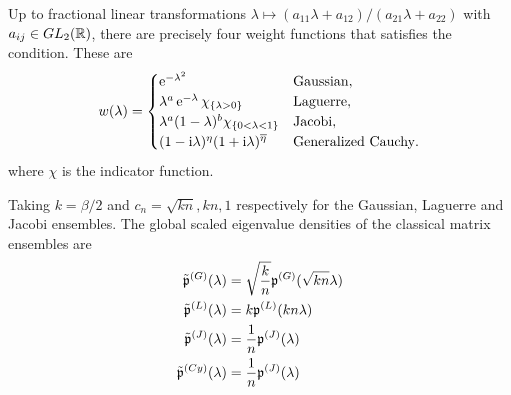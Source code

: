 Up to fractional linear transformations $\lambda \mapsto (a_{11} \lambda + a_{12})/(a_{21} \lambda + a_{22})$ with $a_{ij}\in GL_2(\mathbb{R})$, there are precisely four weight functions that satisfies the condition. These are
\begin{equation}
	w(\lambda) = \begin{cases}
		\operatorname{e}^{-\lambda^2} & \text{Gaussian}, \\
		\lambda^a \operatorname{e}^{-\lambda} \chi_{\{\lambda>0\}} & \text{Laguerre}, \\
		\lambda^a (1-\lambda)^b \chi_{\{0<\lambda<1\}} & \text{Jacobi}, \\
		(1-\mathrm{i}\lambda)^{\eta}(1+\mathrm{i}\lambda)^{\overline{\eta}} & \text{Generalized Cauchy}.
	\end{cases}
\end{equation}
where $\chi$ is the indicator function.

\begin{definition}
	Taking $k = \beta/2$ and $c_n = \sqrt{kn}, kn, 1$ respectively for the Gaussian, Laguerre and Jacobi ensembles. The global scaled eigenvalue densities of the classical matrix ensembles are
	\begin{equation}
		\begin{aligned}
			\tilde{\mathfrak{p}}^{(G)}(\lambda) & = \sqrt{\frac{k}{n}} \mathfrak{p}^{(G)}(\sqrt{kn} \lambda) \\
			\tilde{\mathfrak{p}}^{(L)}(\lambda) & = k \mathfrak{p}^{(L)}(kn\lambda) \\
			\tilde{\mathfrak{p}}^{(J)}(\lambda) & = \frac{1}{n} \mathfrak{p}^{(J)}(\lambda) \\
			\tilde{\mathfrak{p}}^{(Cy)}(\lambda) & = \frac{1}{n} \mathfrak{p}^{(J)}(\lambda)
		\end{aligned}
	\end{equation}
\end{definition}
